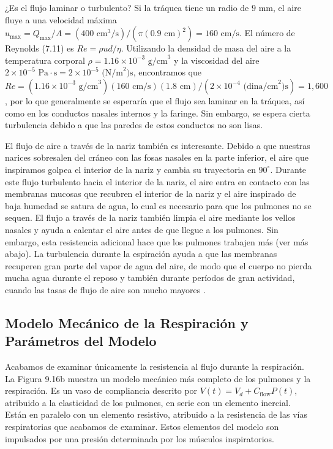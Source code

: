 \documentclass[12pt]{book}
\begin{document}
¿Es el flujo laminar o turbulento? Si la tráquea tiene un radio de $9\text{ mm}$, el aire fluye a una velocidad máxima $u_{\text{max}} = Q_{\text{max}}/A = (400\text{ cm}^3\text{/s})/(\pi(0.9\text{ cm})^2) = 160\text{ cm/s}$. El número de Reynolds (7.11) es $Re = \rho u d / \eta$. Utilizando la densidad de masa del aire a la temperatura corporal $\rho = 1.16 \times 10^{-3}\text{ g/cm}^3$ y la viscosidad del aire $2 \times 10^{-5}\text{ Pa}\cdot\text{s} = 2 \times 10^{-5}\text{ (N/m}^2\text{)s}$, encontramos que $Re = (1.16 \times 10^{-3}\text{ g/cm}^3)(160\text{ cm/s})(1.8\text{ cm}) / (2 \times 10^{-4}\text{ (dina/cm}^2\text{)s}) = 1,600$, por lo que generalmente se esperaría que el flujo sea laminar en la tráquea, así como en los conductos nasales internos y la faringe. Sin embargo, se espera cierta turbulencia debido a que las paredes de estos conductos no son lisas.

El flujo de aire a través de la nariz también es interesante. Debido a que nuestras narices sobresalen del cráneo con las fosas nasales en la parte inferior, el aire que inspiramos golpea el interior de la nariz y cambia su trayectoria en $90^\circ$. Durante este flujo turbulento hacia el interior de la nariz, el aire entra en contacto con las membranas mucosas que recubren el interior de la nariz y el aire inspirado de baja humedad se satura de agua, lo cual es necesario para que los pulmones no se sequen. El flujo a través de la nariz también limpia el aire mediante los vellos nasales y ayuda a calentar el aire antes de que llegue a los pulmones. Sin embargo, esta resistencia adicional hace que los pulmones trabajen más (ver más abajo). La turbulencia durante la espiración ayuda a que las membranas recuperen gran parte del vapor de agua del aire, de modo que el cuerpo no pierda mucha agua durante el reposo y también durante períodos de gran actividad, cuando las tasas de flujo de aire son mucho mayores \cite{7, 16}.

\subsection{Modelo Mecánico de la Respiración y Parámetros del Modelo} \label{subsec:9.5.2}

Acabamos de examinar únicamente la resistencia al flujo durante la respiración. La Figura 9.16b muestra un modelo mecánico más completo de los pulmones y la respiración. Es un vaso de compliancia descrito por $V(t) = V_d + C_{\text{flow}} P(t)$, atribuido a la elasticidad de los pulmones, en serie con un elemento inercial. Están en paralelo con un elemento resistivo, atribuido a la resistencia de las vías respiratorias que acabamos de examinar. Estos elementos del modelo son impulsados por una presión determinada por los músculos inspiratorios.
\end{document}
